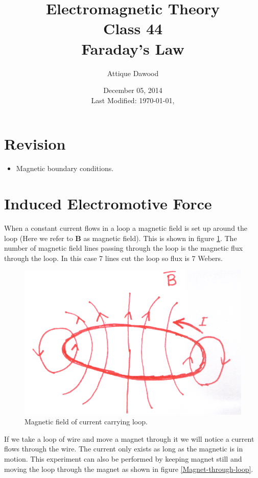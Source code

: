 \documentclass[12pt,a4paper]{article}
\title{Electromagnetic Theory\\Class 44\\Faraday's Law}
\author{Attique Dawood}
\date{December 05, 2014\\[0.2cm] Last Modified: \today, \currenttime}
\begin{document}
\maketitle
\section{Revision}
\begin{itemize}
\item Magnetic boundary conditions.
\end{itemize}
\section{Induced Electromotive Force}
When a constant current flows in a loop a magnetic field is set up around the loop (Here we refer to 
\textbf{B} as magnetic field). This is shown in figure \ref{B-field-loop}. The number of magnetic field lines passing through the loop is the magnetic flux through the loop. In this case 7 lines cut the loop so flux is $7$ Webers.
\begin{figure}[H]
\centering
\includegraphics[scale=0.5]{BFieldLoop.png}
\caption{Magnetic field of current carrying loop.}
\label{B-field-loop}
\end{figure}
If we take a loop of wire and move a magnet through it we will notice a current flows through the wire. The current only exists as long as the magnetic is in motion. This experiment can also be performed by keeping magnet still and moving the loop through the magnet as shown in figure \ref{Magnet-through-loop}. 
\end{document}
